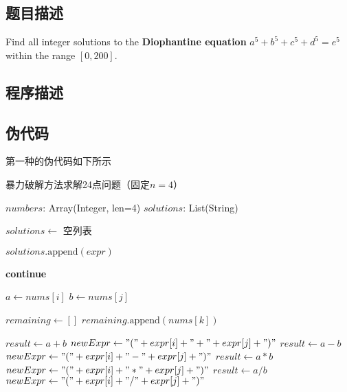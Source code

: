 \subsection{题目描述}
Find all integer solutions to the \textbf{Diophantine equation} \( a^5 + b^5 + c^5 + d^5 = e^5 \) within the range \([0, 200]\).
\subsection{程序描述}

\subsection{伪代码}
第一种的伪代码如下所示
\begin{breakablealgorithm}
    \caption{暴力破解方法求解24点问题（固定$n=4$）}

    \begin{algorithmic}[1]
        \Require $numbers$: Array(Integer, len=4) 
        \Ensure $solutions$: List(String) 
        
        \State $solutions \gets$ 空列表
        
                 
                    \State $solutions.\text{append}(expr)$
                \EndIf
                \State \Return
            \EndIf
            
                        \State \textbf{continue}
                    \EndIf
                    
                    \State $a \gets nums[i]$
                    \State $b \gets nums[j]$
                    
                    \State $remaining \gets []$
                            \State $remaining.\text{append}(nums[k])$
                        \EndIf
                    \EndFor
                    
                            \State $result \gets a + b$
                            \State $newExpr \gets "(" + expr[i] + "+" + expr[j] + ")"$
                            \State $result \gets a - b$
                            \State $newExpr \gets "(" + expr[i] + "-" + expr[j] + ")"$
                            \State $result \gets a * b$
                            \State $newExpr \gets "(" + expr[i] + "*" + expr[j] + ")"$
                            \State $result \gets a / b$
                            \State $newExpr \gets "(" + expr[i] + "/" + expr[j] + ")"$
                        \EndIf
                        

\end{algorithmic}
\end{breakablealgorithm}
